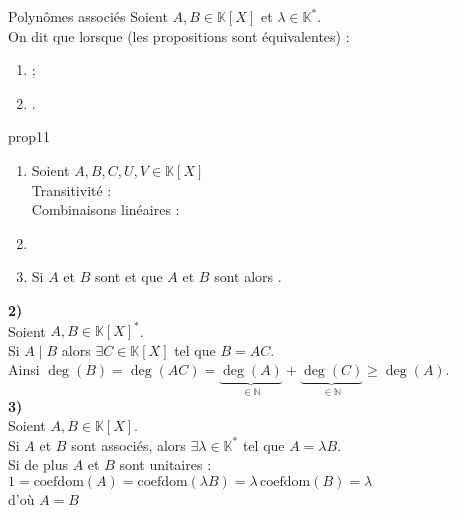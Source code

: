 \documentclass[12pt,a4paper]{report}
\begin{document}
        \begin{definition}{Polynômes associés}{}
        Soient $A, B \in \mathbb{K}[X]$ et $\lambda \in \mathbb{K}^*$.\\
        On dit que  lorsque (les propositions sont équivalentes) :
        \begin{multicols}{2}
        \begin{enumerate}
            \item {} ;
            \item {}.
        \end{enumerate}
        \end{multicols}
        \end{definition}
        
        \begin{propositions}{}{prop11}
        \begin{enumerate}
        \item Soient $A, B, C, U, V \in \mathbb{K}[X]$ \\
        Transitivité :  \\
        Combinaisons linéaires :  
        \item {}
        \item Si $A$ et $B$ sont  et que $A$ et $B$ sont  alors .
        \end{enumerate}
        \end{propositions}
        
        \begin{demo}
        \textbf{2)}\\
        Soient $A, B \in \mathbb{K}[X]^*$.\\
        Si $A \mid B$ alors $\exists C \in \mathbb{K}[X]$ tel que $B = AC$.\\
        Ainsi $\deg(B) = \deg(AC) = \underbrace{\deg(A)}_{\in \mathbb{N}} + \underbrace{\deg(C)}_{\in \mathbb{N}} \geqslant \deg(A)$.\\
        \textbf{3)}\\
        Soient $A, B \in \mathbb{K}[X]$.\\
        Si $A$ et $B$ sont associés, alors $\exists \lambda \in \mathbb{K}^*$ tel que $A = \lambda B$.\\
        Si de plus $A$ et $B$ sont unitaires : $1 = \text{coefdom}(A) = \text{coefdom}(\lambda B) = \lambda\, \text{coefdom}(B) = \lambda$ \\
        d'où $A = B$\\
        \end{demo}
    
\end{document}
